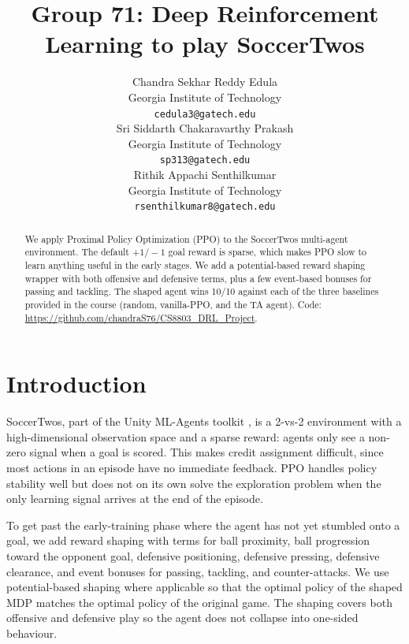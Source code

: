 \documentclass{article}
\title{Group 71: Deep Reinforcement Learning to play SoccerTwos}
\author{
  Chandra Sekhar Reddy Edula\\
  Georgia Institute of Technology \\
  \texttt{cedula3@gatech.edu} \\
  \And
  Sri Siddarth Chakaravarthy Prakash \\
  Georgia Institute of Technology \\
  \texttt{sp313@gatech.edu} \\
  \And
  Rithik Appachi Senthilkumar \\
  Georgia Institute of Technology \\
  \texttt{rsenthilkumar8@gatech.edu} \\
}
\begin{document}
\maketitle


\begin{abstract}
    We apply Proximal Policy Optimization (PPO) to the SoccerTwos multi-agent environment. The default $+1/-1$ goal reward is sparse, which makes PPO slow to learn anything useful in the early stages. We add a potential-based reward shaping wrapper with both offensive and defensive terms, plus a few event-based bonuses for passing and tackling. The shaped agent wins 10/10 against each of the three baselines provided in the course (random, vanilla-PPO, and the TA agent). Code: \url{https://github.com/chandraS76/CS8803_DRL_Project}.
\end{abstract}



\section{Introduction}

    SoccerTwos, part of the Unity ML-Agents toolkit \cite{juliani2018unity}, is a 2-vs-2 environment with a high-dimensional observation space and a sparse reward: agents only see a non-zero signal when a goal is scored. This makes credit assignment difficult, since most actions in an episode have no immediate feedback. PPO \cite{schulman2017proximal} handles policy stability well but does not on its own solve the exploration problem when the only learning signal arrives at the end of the episode.

    To get past the early-training phase where the agent has not yet stumbled onto a goal, we add reward shaping with terms for ball proximity, ball progression toward the opponent goal, defensive positioning, defensive pressing, defensive clearance, and event bonuses for passing, tackling, and counter-attacks. We use potential-based shaping \cite{ng1999policy} where applicable so that the optimal policy of the shaped MDP matches the optimal policy of the original game. The shaping covers both offensive and defensive play so the agent does not collapse into one-sided behaviour.
\end{document}
